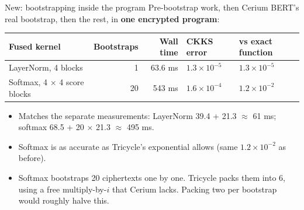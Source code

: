 \documentclass[aspectratio=169]{beamer}
\begin{document}
\begin{frame}{New: bootstrapping inside the program}
\small
Pre-bootstrap work, then Cerium BERT's real bootstrap, then the rest, in \textbf{one encrypted program}:
\begin{center}\footnotesize
\begin{tabular}{@{}lrrll@{}}
\toprule
\textbf{Fused kernel} & \textbf{Bootstraps} & \textbf{Wall time} & \textbf{CKKS error} & \textbf{vs exact function}\\
\midrule
LayerNorm, 4 blocks & 1 & 63.6 ms & $1.3\times10^{-5}$ & $1.3\times10^{-5}$\\
Softmax, 4 $\times$ 4 score blocks & 20 & 543 ms & $1.6\times10^{-4}$ & $1.2\times10^{-2}$\\
\bottomrule
\end{tabular}
\end{center}
\begin{itemize}\small
  \item Matches the separate measurements: LayerNorm 39.4 + 21.3 $\approx$ 61 ms; softmax 68.5 + 20 $\times$ 21.3 $\approx$ 495 ms.
  \item Softmax is as accurate as Tricycle's exponential allows (same $1.2\times10^{-2}$ as before).
  \item Softmax bootstraps 20 ciphertexts one by one. Tricycle packs them into 6, using a free multiply-by-$i$ that Cerium lacks. Packing two per bootstrap would roughly halve this.
\end{itemize}
\end{frame}
\end{document}
